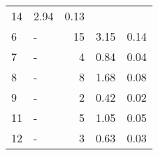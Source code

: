 \begin{longtable}{lXrrr}
       \num{14} &
       \num[round-mode=places,round-precision=2]{2,94} &
         \num[round-mode=places,round-precision=2]{0,13} \\

     6 &
     \multicolumn{1}{X}{ -  } &


       \num{15} &
       \num[round-mode=places,round-precision=2]{3,15} &
         \num[round-mode=places,round-precision=2]{0,14} \\

     7 &
     \multicolumn{1}{X}{ -  } &


       \num{4} &
       \num[round-mode=places,round-precision=2]{0,84} &
         \num[round-mode=places,round-precision=2]{0,04} \\

     8 &
     \multicolumn{1}{X}{ -  } &


       \num{8} &
       \num[round-mode=places,round-precision=2]{1,68} &
         \num[round-mode=places,round-precision=2]{0,08} \\

     9 &
     \multicolumn{1}{X}{ -  } &


       \num{2} &
       \num[round-mode=places,round-precision=2]{0,42} &
         \num[round-mode=places,round-precision=2]{0,02} \\

     11 &
     \multicolumn{1}{X}{ -  } &


       \num{5} &
       \num[round-mode=places,round-precision=2]{1,05} &
         \num[round-mode=places,round-precision=2]{0,05} \\

     12 &
     \multicolumn{1}{X}{ -  } &


       \num{3} &
       \num[round-mode=places,round-precision=2]{0,63} &
         \num[round-mode=places,round-precision=2]{0,03} \\


\end{longtable}

